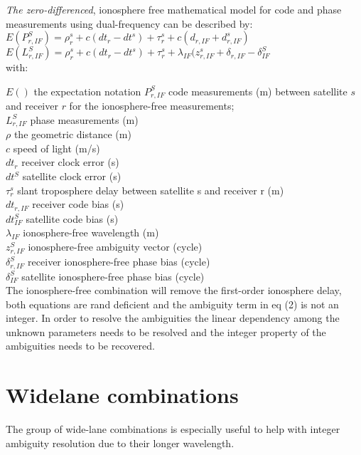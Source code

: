 \textit{The zero-differenced}, ionosphere free mathematical model for code and phase measurements using dual-frequency can be described by:\\

$ E(P_{r,IF}^S) = \rho_{r}^s + c(dt_{r} - dt^s) + \tau_r^s + c (d_{r,IF} + d_{r,IF}^s) $\label{eq:code_IF_eq}\\

$ E(L_{r,IF}^S) = \rho_{r}^s + c(dt_{r} - dt^s) + \tau_r^s + \lambda_{IF} (z_{r,IF}^s + \delta_{r,IF} - \delta_{IF}^S$\label{eq:phase_IF_eq}\\

with:

$E()$ the expectation notation
$P_{r,IF}^S$ code measurements (m) between satellite $s$ and receiver $r$ for the ionosphere-free measurements;\\
$L_{r,IF}^S$ phase measurements (m)\\
$\rho$ the geometric distance (m)\\
$c$ speed of light (m/s)\\
$dt_r$ receiver clock error (s)\\
$dt^S$ satellite clock error (s)\\
$\tau_r^s $ slant troposphere delay between satellite s and receiver r (m)\\
$dt_{r,IF}$ receiver code bias (s)\\
$dt_{IF}^S$ satellite code bias (s)\\
$\lambda_{IF}$ ionosphere-free wavelength (m)\\
$z_{r,IF}^S$ ionosphere-free ambiguity vector (cycle)\\
$\delta_{r,IF}^S$ receiver ionosphere-free phase bias (cycle)\\
$\delta_{IF}^S$ satellite ionosphere-free phase bias (cycle)\\
%
The ionosphere-free combination will remove the first-order ionosphere delay, both equations are rand deficient and the ambiguity term in eq (2) is not an integer. In order to resolve the ambiguities the linear dependency among the unknown parameters needs to be resolved and the integer property of the ambiguities needs to be recovered. 

\section{Widelane combinations}
The group of wide-lane combinations is especially useful to help with integer ambiguity resolution due to their longer wavelength.

